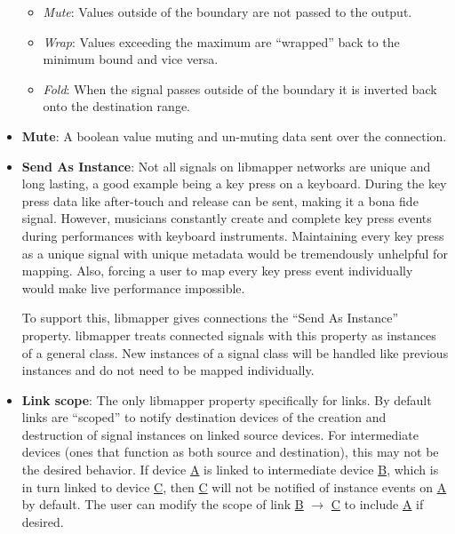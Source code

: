 \begin{itemize}
\begin{itemize}
		\item\emph{Mute}: Values outside of the boundary are not passed to the output.
		\item\emph{Wrap}: Values exceeding the maximum are ``wrapped'' back to the minimum bound and vice versa.
		\item\emph{Fold}: When the signal passes outside of the boundary it is inverted back onto the destination range. 
	\end{itemize}
	\item\textbf{Mute}: A boolean value muting and un-muting data sent over the connection.
	\item\textbf{Send As Instance}: Not all signals on libmapper networks are unique and long lasting, a good example being a key press on a keyboard. During the key press data like after-touch and release can be sent, making it a bona fide signal. However, musicians constantly create and complete key press events during performances with keyboard instruments. Maintaining every key press as a unique signal with unique metadata would be tremendously unhelpful for mapping. Also, forcing a user to map every key press event individually would make live performance impossible.

	To support this, libmapper gives connections the ``Send As Instance'' property. libmapper treats connected signals with this property as instances of a general class. New instances of a signal class will be handled like previous instances and do not need to be mapped individually.
	\item\textbf{Link scope}: The only libmapper property specifically for links. By default links are ``scoped'' to notify destination devices of the creation and destruction of signal instances on linked source devices. For intermediate devices (ones that function as both source and destination), this may not be the desired behavior. If device \url{A} is linked to intermediate device \url{B}, which is in turn linked to device \url{C}, then \url{C} will not be notified of instance events on \url{A} by default. The user can modify the scope of link \url{B} $\rightarrow$ \url{C} to include \url{A} if desired.

\end{itemize}



